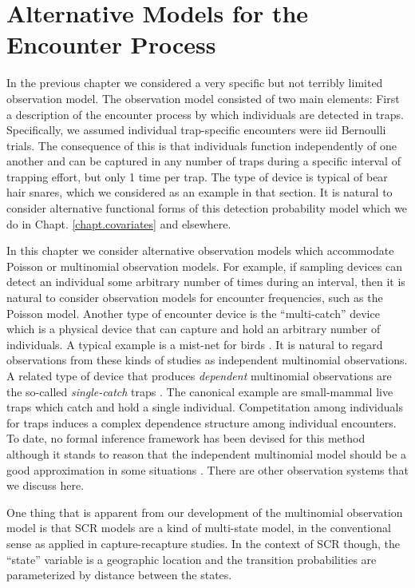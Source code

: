 \chapter{Alternative Models for the Encounter Process}
\label{chapt.poisson-mn}

In the previous chapter we considered a very specific but not terribly
limited observation model. The observation model consisted of two main
elements: First a description of the encounter process by which
individuals are detected in traps. Specifically, we assumed individual
trap-specific encounters were iid Bernoulli trials. The consequence of
this is that individuals function independently of one another and can
be captured in any number of traps during a specific interval of
trapping effort, but only 1 time per trap.  The type of device is
typical of bear hair snares, which we considered as an example in that
section.  It is natural to consider alternative functional forms of
this detection probability model which we do in
Chapt. \ref{chapt.covariates} and elsewhere.

In this chapter we consider alternative observation models which
accommodate Poisson or multinomial observation models. For example, if
sampling devices can detect an individual some arbitrary number of
times during an interval, then it is natural to consider observation
models for encounter frequencies, such as the Poisson model. Another
type of encounter device is the ``multi-catch'' device
\citep{efford_etal:2009euring} which
is a physical device that can capture and hold an arbitrary number of
individuals. A typical example is a mist-net for birds
\citep{borchers_efford:2008}.  It is natural to regard observations
from these kinds of studies as independent multinomial observations.
A related type of device that produces {\it dependent} multinomial
observations are the so-called {\it single-catch} traps
\citep{efford_etal:2009euring}. The canonical example are small-mammal
live traps which catch and hold a single individual. Competitation
among individuals for traps induces a complex dependence structure
among individual encounters. To date, no formal inference framework
has been devised for this method although it stands to reason that the
independent multinomial model should be a good approximation in some
situations \citep{efford_etal:2009euring}.  There are other
observation systems that we discuss here.

One thing that is apparent from our development of the multinomial
observation model is that SCR models are a kind of multi-state model,
in the conventional sense as applied in capture-recapture studies. In
the context of SCR though, the ``state'' variable is a geographic
location and the transition probabilities are parameterized by
distance between the states.






